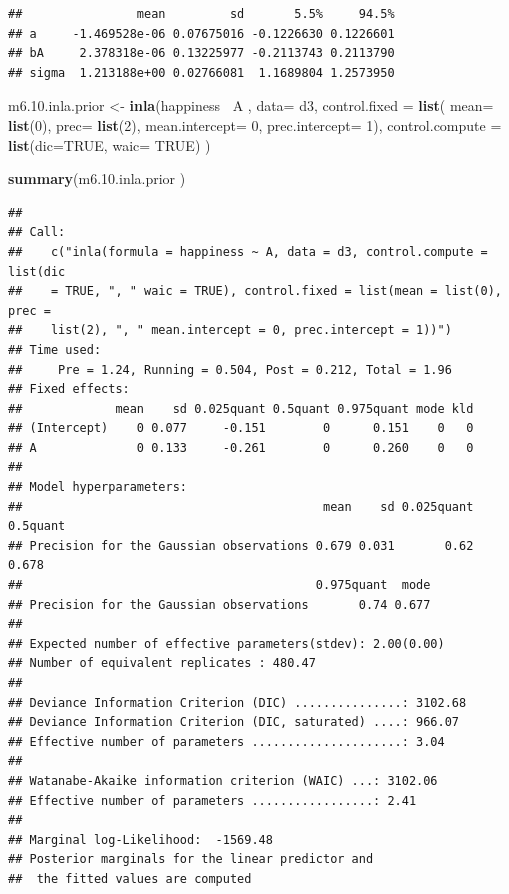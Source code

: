 \documentclass[
]{article}
\newenvironment{Shaded}{\begin{snugshade}}{\end{snugshade}}
\newcommand{\DataTypeTok}[1]{\textcolor[rgb]{0.13,0.29,0.53}{#1}}
\newcommand{\DecValTok}[1]{\textcolor[rgb]{0.00,0.00,0.81}{#1}}
\newcommand{\FloatTok}[1]{\textcolor[rgb]{0.00,0.00,0.81}{#1}}
\newcommand{\KeywordTok}[1]{\textcolor[rgb]{0.13,0.29,0.53}{\textbf{#1}}}
\newcommand{\NormalTok}[1]{#1}
\newcommand{\OperatorTok}[1]{\textcolor[rgb]{0.81,0.36,0.00}{\textbf{#1}}}
\newcommand{\OtherTok}[1]{\textcolor[rgb]{0.56,0.35,0.01}{#1}}
\newcommand{\StringTok}[1]{\textcolor[rgb]{0.31,0.60,0.02}{#1}}
\begin{document}
\begin{verbatim}
##                mean         sd       5.5%     94.5%
## a     -1.469528e-06 0.07675016 -0.1226630 0.1226601
## bA     2.378318e-06 0.13225977 -0.2113743 0.2113790
## sigma  1.213188e+00 0.02766081  1.1689804 1.2573950
\end{verbatim}

\begin{Shaded}
\begin{Highlighting}[]
\NormalTok{m6.}\FloatTok{10.}\NormalTok{inla.prior <-}\StringTok{ }\KeywordTok{inla}\NormalTok{(happiness}\OperatorTok{~}\StringTok{ }\NormalTok{A , }\DataTypeTok{data=}\NormalTok{ d3, }
                        \DataTypeTok{control.fixed =} \KeywordTok{list}\NormalTok{(}
        \DataTypeTok{mean=} \KeywordTok{list}\NormalTok{(}\DecValTok{0}\NormalTok{), }
        \DataTypeTok{prec=} \KeywordTok{list}\NormalTok{(}\DecValTok{2}\NormalTok{),}
        \DataTypeTok{mean.intercept=} \DecValTok{0}\NormalTok{, }
        \DataTypeTok{prec.intercept=} \DecValTok{1}\NormalTok{),}
        \DataTypeTok{control.compute =} \KeywordTok{list}\NormalTok{(}\DataTypeTok{dic=}\OtherTok{TRUE}\NormalTok{, }\DataTypeTok{waic=} \OtherTok{TRUE}\NormalTok{)}
\NormalTok{)}

\KeywordTok{summary}\NormalTok{(m6.}\FloatTok{10.}\NormalTok{inla.prior )}
\end{Highlighting}
\end{Shaded}

\begin{verbatim}
## 
## Call:
##    c("inla(formula = happiness ~ A, data = d3, control.compute = list(dic 
##    = TRUE, ", " waic = TRUE), control.fixed = list(mean = list(0), prec = 
##    list(2), ", " mean.intercept = 0, prec.intercept = 1))") 
## Time used:
##     Pre = 1.24, Running = 0.504, Post = 0.212, Total = 1.96 
## Fixed effects:
##             mean    sd 0.025quant 0.5quant 0.975quant mode kld
## (Intercept)    0 0.077     -0.151        0      0.151    0   0
## A              0 0.133     -0.261        0      0.260    0   0
## 
## Model hyperparameters:
##                                          mean    sd 0.025quant 0.5quant
## Precision for the Gaussian observations 0.679 0.031       0.62    0.678
##                                         0.975quant  mode
## Precision for the Gaussian observations       0.74 0.677
## 
## Expected number of effective parameters(stdev): 2.00(0.00)
## Number of equivalent replicates : 480.47 
## 
## Deviance Information Criterion (DIC) ...............: 3102.68
## Deviance Information Criterion (DIC, saturated) ....: 966.07
## Effective number of parameters .....................: 3.04
## 
## Watanabe-Akaike information criterion (WAIC) ...: 3102.06
## Effective number of parameters .................: 2.41
## 
## Marginal log-Likelihood:  -1569.48 
## Posterior marginals for the linear predictor and
##  the fitted values are computed
\end{verbatim}
\end{document}

